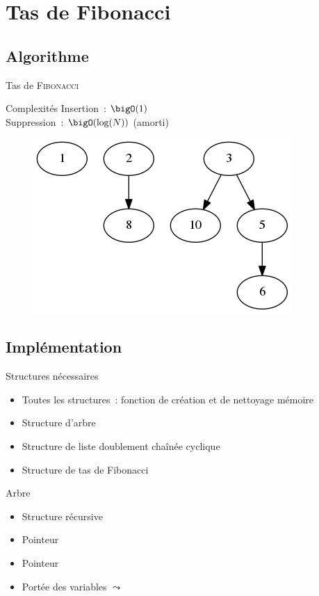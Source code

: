 \documentclass[11pt]{beamer}
\begin{document}
\section{Tas de Fibonacci}

\subsection{Algorithme}

\begin{frame}{Tas de \textsc{Fibonacci}}
\begin{block}{Complexités}
Insertion~: $\bigO(1)$\\
Suppression~: $\bigO(\log(N))$ (amorti)
\end{block}

\vspace{1em}
\begin{figure}[H]
\includegraphics[width=0.6\linewidth]{fiboheap.png}
\end{figure}
\end{frame}

\subsection{Implémentation}

\begin{frame}{Structures nécessaires}
\begin{itemize}
\item Toutes les structures~: fonction de création et de nettoyage mémoire
\item Structure d'\alert{arbre}
\item Structure de \alert{liste doublement chaînée cyclique}
\item Structure de \alert{tas de Fibonacci}
\end{itemize}
\end{frame}

\begin{frame}{Arbre}
\begin{itemize}
\item Structure récursive
\item Pointeur 
\item Pointeur 
\item Portée des variables $\leadsto$ 
\end{itemize}
\end{frame}
\end{document}
